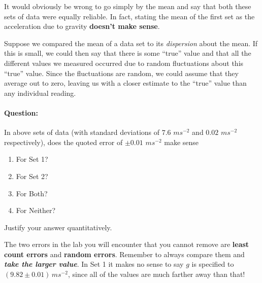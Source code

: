 It would obviously be wrong to go simply by the mean and say that both these sets of data were equally reliable. In fact, stating the mean of the first set as the acceleration due to gravity \textbf{doesn't make sense}. 

Suppose we compared the mean of a data set to its \textit{dispersion} about the mean. If this is small, we could then say that there is some ``true'' value and that all the different values we measured occurred due to random fluctuations about this ``true'' value. Since the fluctuations are random, we could assume that they average out to zero, leaving us with a closer estimate to the ``true'' value than any individual reading.

\begin{question}
\paragraph{Question:} In above sets of data (with standard deviations of $7.6\,\,ms^{-2}$ and $0.02\,\,ms^{-2}$ respectively), does the quoted error of $\pm 0.01\,\, ms^{-2}$ make sense
\begin{enumerate}
    \item For Set 1?
    \item For Set 2?
    \item For Both?
    \item For Neither?
\end{enumerate} 
Justify your answer quantitatively.
\end{question}

\begin{imp}
The two errors in the lab you will encounter that you cannot remove are \textbf{least count errors} and \textbf{random errors}. Remember to always compare them and \textbf{\textit{take the larger value}}. In Set 1 it makes no sense to say $g$ is specified to $(9.82\pm0.01)\,ms^{-2}$, since all of the values are much farther away than that!
\end{imp}

